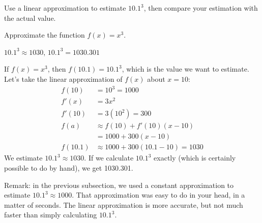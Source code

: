 \begin{Mquestion}
Use a linear approximation to estimate $10.1^3$, then compare your estimation with the actual value.
\end{Mquestion}
\begin{hint}
Approximate the function $f(x)=x^3$.
\end{hint}
\begin{answer}
$10.1^3 \approx 1030$, $10.1^3 = 1030.301$
\end{answer}
\begin{solution}
If $f(x)=x^3$, then $f(10.1)=10.1^3$, which is the value we want to estimate. Let's take the linear approximation of $f(x)$ about $x=10$:
\begin{align*}
f(10)&=10^3=1000\\
f'(x)&=3x^2\\
f'(10)&=3(10^2)=300\\
f(a) &\approx f(10)+f'(10)(x-10)\\
&=1000+300(x-10)\\
f(10.1)& \approx 1000+300(10.1-10)=1030
\end{align*}
We estimate $10.1^3 \approx 1030$. If we calculate $10.1^3$ exactly (which is certainly possible to do by hand), we get 1030.301.

Remark: in the previous subsection, we used a constant approximation to estimate $10.1^3 \approx 1000$. That approximation was easy to do in your head, in a matter of seconds. The linear approximation is more accurate, but not much faster than simply calculating $10.1^3$.
\end{solution}


